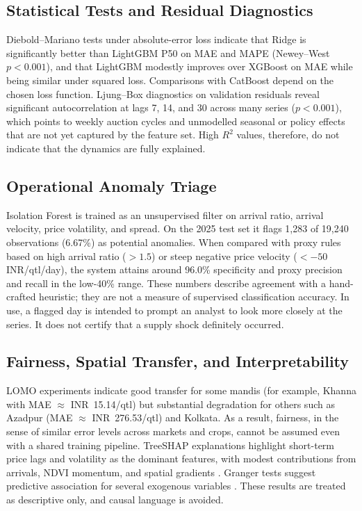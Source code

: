 \documentclass[a4paper,conference]{IEEEtran}
\begin{document}
\subsection{Statistical Tests and Residual Diagnostics}
Diebold--Mariano tests under absolute-error loss indicate that Ridge is significantly better than LightGBM P50 on MAE and MAPE (Newey--West $p < 0.001$), and that LightGBM modestly improves over XGBoost on MAE while being similar under squared loss. Comparisons with CatBoost depend on the chosen loss function. Ljung--Box diagnostics on validation residuals reveal significant autocorrelation at lags 7, 14, and 30 across many series ($p < 0.001$), which points to weekly auction cycles and unmodelled seasonal or policy effects that are not yet captured by the feature set. High $R^2$ values, therefore, do not indicate that the dynamics are fully explained.

\subsection{Operational Anomaly Triage}
Isolation Forest is trained as an unsupervised filter on arrival ratio, arrival velocity, price volatility, and spread. On the 2025 test set it flags 1{,}283 of 19{,}240 observations (6.67\%) as potential anomalies. When compared with proxy rules based on high arrival ratio ($>1.5$) or steep negative price velocity ($<-50$ INR/qtl/day), the system attains around 96.0\% specificity and proxy precision and recall in the low-40\% range. These numbers describe agreement with a hand-crafted heuristic; they are not a measure of supervised classification accuracy. In use, a flagged day is intended to prompt an analyst to look more closely at the series. It does not certify that a supply shock definitely occurred.

\subsection{Fairness, Spatial Transfer, and Interpretability}
LOMO experiments indicate good transfer for some mandis (for example, Khanna with MAE $\approx$ INR~15.14/qtl) but substantial degradation for others such as Azadpur (MAE $\approx$ INR~276.53/qtl) and Kolkata. As a result, fairness, in the sense of similar error levels across markets and crops, cannot be assumed even with a shared training pipeline. TreeSHAP explanations highlight short-term price lags and volatility as the dominant features, with modest contributions from arrivals, NDVI momentum, and spatial gradients \cite{lundberg2020local}. Granger tests suggest predictive association for several exogenous variables \cite{granger1969investigating}. These results are treated as descriptive only, and causal language is avoided.
\end{document}
